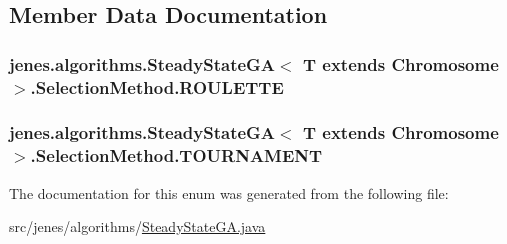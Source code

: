 \subsection{Member Data Documentation}
\hypertarget{enumjenes_1_1algorithms_1_1_steady_state_g_a_3_01_t_01extends_01_chromosome_01_4_1_1_selection_method_aea587ece8e60bb24368258652b8193cc}{
\subsubsection[{R\-O\-U\-L\-E\-T\-T\-E}]{\setlength{\rightskip}{0pt plus 5cm}jenes.\-algorithms.\-Steady\-State\-G\-A$<$ T extends Chromosome $>$.Selection\-Method.\-R\-O\-U\-L\-E\-T\-T\-E}}\label{enumjenes_1_1algorithms_1_1_steady_state_g_a_3_01_t_01extends_01_chromosome_01_4_1_1_selection_method_aea587ece8e60bb24368258652b8193cc}
\hypertarget{enumjenes_1_1algorithms_1_1_steady_state_g_a_3_01_t_01extends_01_chromosome_01_4_1_1_selection_method_a1cd629bf261d758c615ea8435fd4788f}{
\subsubsection[{T\-O\-U\-R\-N\-A\-M\-E\-N\-T}]{\setlength{\rightskip}{0pt plus 5cm}jenes.\-algorithms.\-Steady\-State\-G\-A$<$ T extends Chromosome $>$.Selection\-Method.\-T\-O\-U\-R\-N\-A\-M\-E\-N\-T}}\label{enumjenes_1_1algorithms_1_1_steady_state_g_a_3_01_t_01extends_01_chromosome_01_4_1_1_selection_method_a1cd629bf261d758c615ea8435fd4788f}


The documentation for this enum was generated from the following file\-:\begin{DoxyCompactItemize}
\item 
src/jenes/algorithms/\hyperlink{_steady_state_g_a_8java}{Steady\-State\-G\-A.\-java}\end{DoxyCompactItemize}
